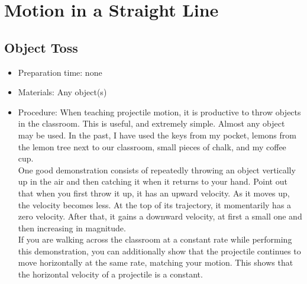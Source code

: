 \section{Motion in a Straight Line}

\subsection{Object Toss}
\begin{itemize}
\item{Preparation time: none}
\item{Materials: Any object(s)}
\item{Procedure: When teaching projectile motion, it is productive to throw objects in the classroom. This is useful, and extremely simple. Almost any object may be used. In the past, I have used the keys from my pocket, lemons from the lemon tree next to our classroom, small pieces of chalk, and my coffee cup.\\
One good demonstration consists of repeatedly throwing an object vertically up in the air and then catching it when it returns to your hand. Point out that when you first throw it up, it has an upward velocity. As it moves up, the velocity becomes less. At the top of its trajectory, it momentarily has a zero velocity. After that, it gains a downward velocity, at first a small one and then increasing in magnitude.\\
If you are walking across the classroom at a constant rate while performing this demonstration, you can additionally show that the projectile continues to move horizontally at the same rate, matching your motion. This shows that the horizontal velocity of a projectile is a constant.}
\end{itemize}







